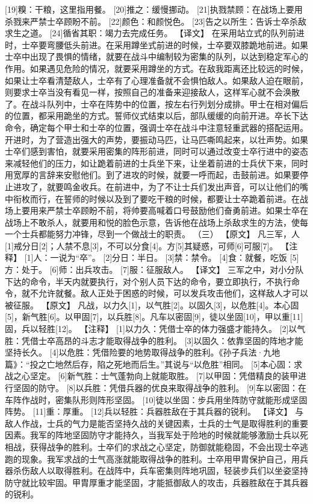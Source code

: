 \documentclass[a4paper,12pt,UTF8,twoside]{ctexbook}
\begin{document}
[19]糗：干粮，这里指用餐。
[20]推之：缓慢挪动。
[21]执戮禁顾：在战场上要用杀戮来严禁士卒顾盼不前。
[22]颜色：和颜悦色。
[23]告之以所生：告诉士卒杀敌求生之道。
[24]循省其职：竭力去完成任务。
【译文】
在采用站立式的队列前进时，士卒要弯腰低头前进。在采用蹲坐式前进的时候，士卒要双膝跪地前进。如果士卒中出现了畏惧的情绪，就要在战斗中编制较为密集的队列，以达到稳定军心的作用。如果遇见危险的情况，就要采用蹲坐的方式。在敌我距离还比较远的时候，如果让士卒看清楚敌人，士卒有了心理准备就不会惧怕敌人。如果敌人迫在眼前，则要求士卒当没有看见一样，按照自己的准备来迎接敌人，这样军心就不会涣散了。在战斗队列中，士卒在阵势中的位置，按左右行列划分成排。甲士在相对偏后的位置，都采用跪坐的方式。誓师仪式结束以后，部队缓缓的向前开进。卒长下达命令，确定每个甲士和士卒的位置，强调士卒在战斗中注意轻重武器的搭配运用。开进时，为了营造出强大的声势，要振动马匹，让马匹嘶鸣起来，以壮声势。如果士卒们感到害怕，就要采用密集的阵形前进，同时可以通过改变士卒行进中的姿态来减轻他们的压力，如让跪着前进的士兵坐下来，让坐着前进的士兵伏下来，同时用宽厚的言辞来安慰他们。到了进攻的时候，就要一呼而起，击鼓前进。如果要停止进攻了，就要鸣金收兵。在前进中，为了不让士兵们发出声音，可以让他们的嘴中衔枚而行，在誓师的时候以及到了要吃干粮的时候，都要让士卒跪着前进。在战场上要用来严禁士卒顾盼不前，将帅要高喊着口号鼓励他们奋勇前进。如果士卒在战场上不敢杀人，就要用和悦的脸色示意，告诉他在战场上杀敌求生的方法，使每一个士兵都能努力冲锋，尽到一个做战士的职责。
（三）
【原文】
凡三军，人[1]戒分日[2]；人禁不息[3]，不可以分食[4]。方[5]其疑惑，可师[6]可服[7]。
【注释】
[1]人：一说为“卒”。
[2]分日：半日。
[3]禁：禁令。
[4]食：就餐，吃饭
[5]方：处于。
[6]师：出兵攻击。
[7]服：征服敌人。
【译文】
三军之中，对小分队下达的命令，半天内就要执行，对个别人员下达的命令，要立即执行，不执行命令，就不允许就餐。敌人正处于困惑的时候，可以发兵攻击他们，这样敌人才可以被征服。
【原文】
凡战，以力久[1]，以气胜[2]。以固久[3]，以危胜[4]。本心固[5]，新气胜[6]。以甲固[7]，以兵胜[8]。凡车以密固[9]，徒以坐固[10]，甲以重[11]固，兵以轻胜[12]。
【注释】
[1]以力久：凭借士卒的体力强盛才能持久。
[2]以气胜：凭借士卒高昂的斗志才能取得战争的胜利。
[3]以固久：依靠坚固的阵地才能坚持长久。
[4]以危胜：凭借险要的地势取得战争的胜利。《孙子兵法·九地篇》：“投之亡地然后存，陷之死地而后生。”其说与“以危胜”相同。
[5]本心固：求战之心坚定。
[6]新气胜：士气蓬勃向上就能取胜。
[7]以甲固：凭借精良的装甲进行坚固的防守。
[8]以兵胜：凭借兵器的优良来取得战争的胜利。
[9]车以密固：在车阵作战时，密集队形则阵形坚固。
[10]徒以坐固：步兵用坐阵防守就能形成坚固阵势。
[11]重：厚重。
[12]兵以轻胜：兵器胜敌在于其兵器的锐利。
【译文】
与敌人作战，士兵的气力是能否坚持久战的关键因素，士兵的士气是取得胜利的重要因素。我军的阵地坚固防守才能持久，当我军处于险地的时候就能够激励士兵以死相战，获得战争的胜利。士卒们的求战之心坚定，防御就能稳固，不会出现士卒逃跑的现象。我军求战的士气高涨就能取得战争的胜利。士卒用甲胄保护自己，用兵器杀伤敌人以取得胜利。在战阵中，兵车密集则阵地巩固，轻装步兵们以坐姿坚持防守就比较牢固。甲胄厚重才能坚固，才能抵御敌人的攻击，兵器胜敌在于其兵器的锐利。
\end{document}
